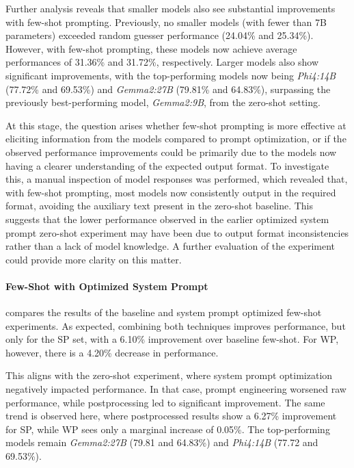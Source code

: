 Further analysis reveals that smaller models also see substantial improvements with few-shot prompting. Previously, no smaller models (with fewer than 7B parameters) exceeded random guesser performance (24.04\% and 25.34\%). However, with few-shot prompting, these models now achieve average performances of 31.36\% and 31.72\%, respectively. Larger models also show significant improvements, with the top-performing models now being \textit{Phi4:14B} (77.72\% and 69.53\%) and \textit{Gemma2:27B} (79.81\% and 64.83\%), surpassing the previously best-performing model, \textit{Gemma2:9B}, from the zero-shot setting.

At this stage, the question arises whether few-shot prompting is more effective at eliciting information from the models compared to prompt optimization, or if the observed performance improvements could be primarily due to the models now having a clearer understanding of the expected output format. To investigate this, a manual inspection of model responses was performed, which revealed that, with few-shot prompting, most models now consistently output in the required format, avoiding the auxiliary text present in the zero-shot baseline. This suggests that the lower performance observed in the earlier optimized system prompt zero-shot experiment may have been due to output format inconsistencies rather than a lack of model knowledge. A further evaluation of the  experiment could provide more clarity on this matter.

\paragraph{Few-Shot with Optimized System Prompt}

 compares the results of the baseline and system prompt optimized few-shot experiments. As expected, combining both techniques improves performance, but only for the \ac{SP} set, with a 6.10\% improvement over baseline few-shot. For \ac{WP}, however, there is a 4.20\% decrease in performance.

This aligns with the zero-shot experiment, where system prompt optimization negatively impacted performance. In that case, prompt engineering worsened raw performance, while postprocessing led to significant improvement. The same trend is observed here, where postprocessed results show a 6.27\% improvement for \ac{SP}, while \ac{WP} sees only a marginal increase of 0.05\%. The top-performing models remain \textit{Gemma2:27B} (79.81 and 64.83\%) and \textit{Phi4:14B} (77.72 and 69.53\%).


